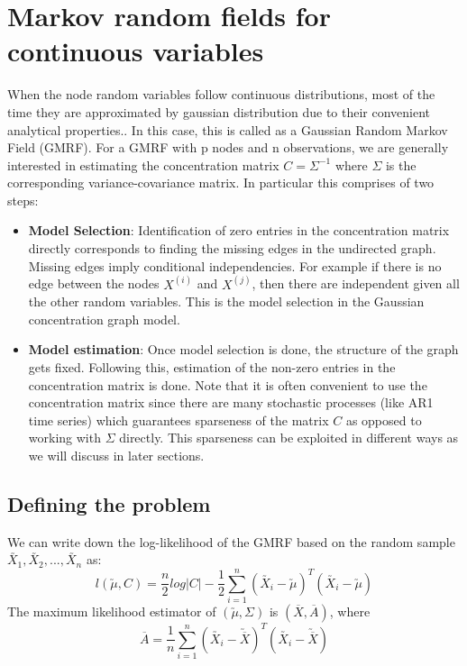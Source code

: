 \documentclass[12pt]{article}
\begin{document}
\section{Markov random fields for continuous variables}
When the node random variables follow continuous distributions, most of the time they are approximated by gaussian distribution due to their convenient analytical properties.\cite{friedman2001elements}. In this case, this is called as a Gaussian Random Markov Field (GMRF). For a GMRF with p nodes and n observations, we are generally interested in estimating the concentration matrix $C=\Sigma^{-1}$ where $\Sigma$ is the corresponding variance-covariance matrix. In particular this comprises of two steps:
\begin{itemize}
\item \textbf{Model Selection}: Identification of zero entries in the concentration matrix directly corresponds to finding the missing edges in the undirected graph. Missing edges imply conditional independencies. For example if there is no edge between the nodes $X^{(i)}$ and $X^{(j)}$, then there are independent given all the other random variables. This is the model selection in the Gaussian concentration graph model.
\item \textbf{Model estimation}: Once model selection is done, the structure of the graph gets fixed. Following this, estimation of the non-zero entries in the concentration matrix is done. Note that it is often convenient to use the concentration matrix since there are many stochastic processes (like AR1 time series) which guarantees sparseness of the matrix $C$ as opposed to working with $\Sigma$ directly. This sparseness can be exploited in different ways as we will discuss in later sections.
\end{itemize}

\subsection{Defining the problem}
We can write down the log-likelihood of the GMRF based on the random sample $\utilde{X_1},\utilde{X_2},..., \utilde{X_n}$ as\cite{yuan2007model}:\[l(\utilde{\mu},C)=\dfrac{n}{2}log|C|-\dfrac{1}{2}\sum\limits_{i=1}^{n}(\utilde{X_i}-\utilde{\mu})^T(\utilde{X_i}-\utilde{\mu})\]
The maximum likelihood estimator of $(\utilde{\mu},\Sigma)$ is $(\overline{X},\overline{A})$, where \[\overline{A}=\dfrac{1}{n}\sum\limits_{i=1}^n(\utilde{X_i}-\utilde{\overline{X}})^T(\utilde{X_i}-\utilde{\overline{X}})\]
\end{document}
